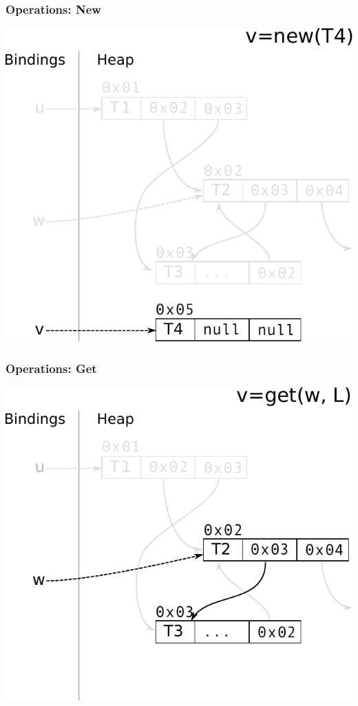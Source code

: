 \documentclass[utf8x]{beamer}
\begin{document}
\begin{frame}[plain]
  \frametitle{Operations: New}
  \includegraphics[scale=0.8]{figures/new02}
\end{frame}

\begin{frame}[plain]
  \frametitle{Operations: Get}
  \includegraphics[scale=0.8]{figures/get01}
\end{frame}
\end{document}
